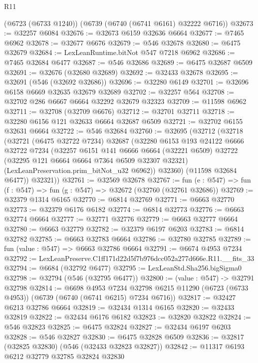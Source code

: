 \begin{lexlean}{R11}
\begin{coremodule}
    (@6723 (@6733 @1240))
    (@6739 (@6740 (@6741 @6161) @32222 @6716))
@32673 := @32257 @6084
@32676 := @32673 @6159 @32636 @6664
@32677 := @7465 @6962
@32678 := @32677 @6676
@32679 := @546 @32678
@32680 := @6475 @32679
@32684 := LexLeanRuntime.bitNot @547 @7218 @6962
@32686 := @7465 @32684 @6477
@32687 := @546 @32686
@32689 := @6475 @32687 @6509
@32691 := @32676 (@32680 @32689)
@32692 := @32433 @32678
@32695 := @32691 (@546 (@32692 @32686))
@32696 := @32280 @6149
@32701 := @32696 @6158 @6669 @32635 @32679 @32689
@32702 := @32257 @564
@32708 := @32702 @286 @6667 @6664 @32292 @32679 @32323
@32709 := @11598 @6962
@32711 := @32708 (@32709 @6676)
@32712 := @32701 @32711
@32718 := @32280 @6156 @121 @32633 @6664 @32687 @6509
@32721 := @32702 @6155 @32631 @6664
@32722 := @546 @32684
@32760 := @32695
    (@32712
      (@32718
        (@32721
          (@6475 @32722 @7234)
          @32687
          (@32280
            @6153
            @193
            @24122
            @6666
            @32722
            @7234
            (@32257
              @6151
              @141
              @6666
              @6664
              (@32221 @6509)
              @32722
              (@32295 @121 @6664 @6664 @7364 @6509 @32307 @32321)
              (LexLeanPreservation.prim_bitNot_u32 @6962))
            @32360)
          (@11598 @32684 @6477))
        @32321))
@32761 := @32569 @32678
@32767 := fun (e : @547) => fun (f : @547) => fun (g : @547) => @32672 (@32760 (@32761 @32686))
@32769 := @32379 @1314 @6165
@32770 := @6814 @32769
@32771 := @6663 @32770
@32773 := @32379 @6176 @6182
@32774 := @6814 @32773
@32776 := @6663 @32774 @6664
@32777 := @32771 @32776
@32779 := @6663 @32777 @6664
@32780 := @6663 @32779
@32782 := @32379 @6197 @6203
@32783 := @6814 @32782
@32785 := @6663 @32783 @6664
@32786 := @32780 @32785
@32789 := fun (value : @547) => @6663 @32786 @6664
@32791 := @6674 @4953 @7234
@32792 := LexLeanPreserve.C1ff171d22d5f7b976dcc052a277d666e.R11.__fits_33
@32794 := @6684 (@32792 @6477)
@32795 := LexLeanStd.Sha256.bigSigma0
@32798 := @32794 (@546 (@32795 @6477))
@32800 := (value : @547) -> @32791 @32798
@32814 := @6698
    @4953
    @7234
    @32798
    @6215
    @11290
    (@6723 (@6733 @4953))
    (@6739 (@6740 (@6741 @6215) @7234 @6716))
@32817 := @32427 @6213 @32786 @6664
@32819 := @32434 @1314 @6165
@32820 := @32433 @32819
@32822 := @32434 @6176 @6182
@32823 := @32820 @32822
@32824 := @546 @32823
@32825 := @6475 @32824
@32827 := @32434 @6197 @6203
@32828 := @546 @32827
@32830 := @6475 @32828 @6509
@32836 := @32817 (@32825 @32830) (@546 (@32433 @32823 @32827))
@32842 := @11317 @6193 @6212 @32779 @32785 @32824 @32830

\end{coremodule}
\end{lexlean}
